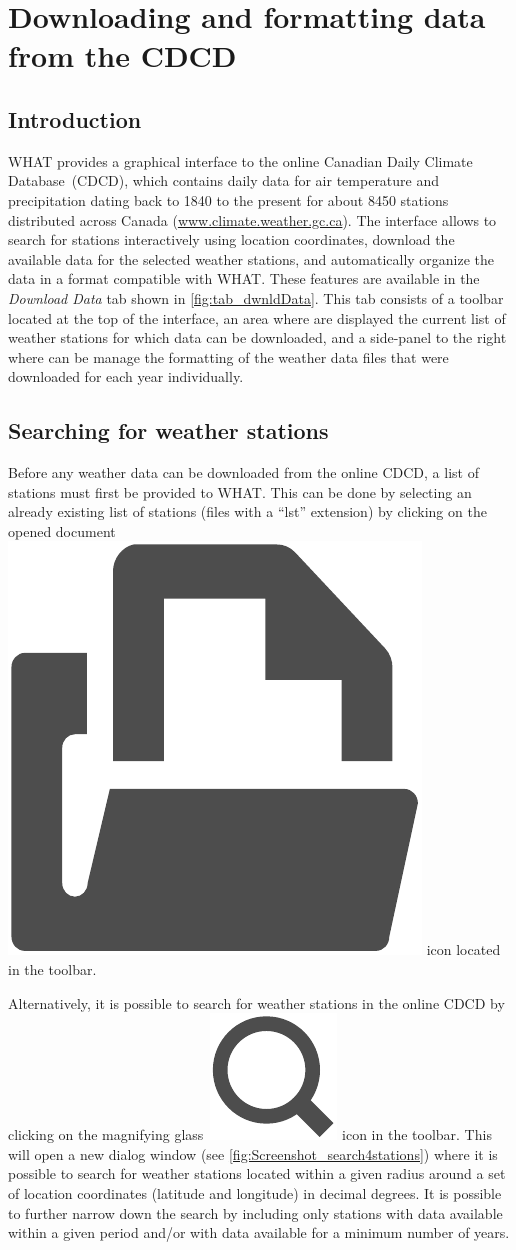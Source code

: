 \documentclass[WHATMANUAL.tex]{subfiles}
\begin{document}
\section{Downloading and formatting data from the CDCD}

\subsection{Introduction}

WHAT provides a graphical interface to the online Canadian Daily Climate Database~(CDCD), which contains daily data for air temperature and precipitation dating back to 1840 to the present for about 8450 stations distributed across Canada (\url{www.climate.weather.gc.ca}). The interface allows to search for stations interactively using location coordinates, download the available data for the selected weather stations, and automatically organize the data in a format compatible with WHAT. These features are available in the \emph{Download Data} tab shown in \cref{fig:tab_dwnldData}. This tab consists of a toolbar located at the top of the interface, an area where are displayed the current list of weather stations for which data can be downloaded, and a side-panel to the right where can be manage the formatting of the weather data files that were downloaded for each year individually. 

\subsection{Searching for weather stations}

Before any weather data can be downloaded from the online CDCD, a list of stations must first be provided to WHAT. This can be done by selecting an already existing list of stations (files with a ``lst'' extension) by clicking on the opened document~{\includegraphics[height=2ex]{img/open_file}} icon located in the toolbar. 

Alternatively, it is possible to search for weather stations in the online CDCD by clicking on the magnifying glass~{\includegraphics[height=2ex]{img/search}} icon in the toolbar. This will open a new dialog window (see \cref{fig:Screenshot_search4stations}) where it is possible to search for weather stations located within a given radius around a set of location coordinates (latitude and longitude) in decimal degrees. It is possible to further narrow down the search by including only stations with data available within a given period and/or with data available for a minimum number of years.
\end{document}
